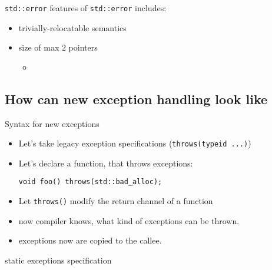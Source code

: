 \documentclass[10pt,a4paper]{beamer}
\begin{document}
\begin{frame}{\texttt{std::error}}
	features of \texttt{std::error} includes:
	\begin{itemize}
		\item trivially-relocatable semantics
		\item size of max 2 pointers
		\begin{itemize}
			\item 
		\end{itemize}
	\end{itemize}
\end{frame}
	
	
\subsection{How can new exception handling look like}
\begin{frame}[fragile]{Syntax for new exceptions}
	\begin{itemize}
		\item Let's take legacy exception specifications (\texttt{throws(typeid ...)})
		\item Let's declare a function, that throws exceptions:
		\begin{verbatim}
void foo() throws(std::bad_alloc);
		\end{verbatim}
		\item Let \texttt{throws()} modify the return channel of a function
		\item now compiler knows, what kind of exceptions can be thrown.
		\item exceptions now are {\color{red}copied} to the callee.
	\end{itemize}
\end{frame}

\begin{frame}{static exceptions specification}
	
\end{frame}
	
\end{document}
